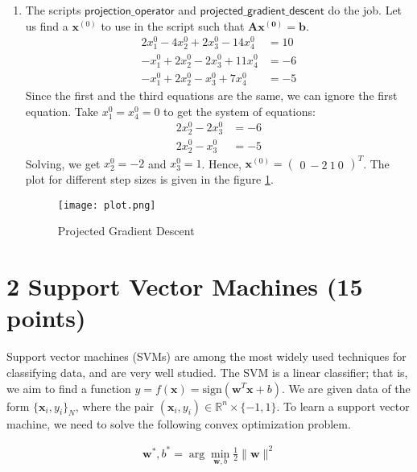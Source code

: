\documentclass[12pt,a4paper]{article}
\newcommand{\R}{\mathbb{R}}
\theoremstyle{remark}
\begin{document}
\begin{enumerate}
    \item The scripts $\mathsf{projection\_operator}$ and $\mathsf{projected\_gradient\_descent}$ do the job. Let us find a $\mathbf{x}^{(0)}$ to use in the script such that $\mathbf{Ax^{(0)} = b}$.
    \begin{align*}
        2x_1^0 - 4x_2^0 + 2x_3^0 - 14x_4^0 &= 10\\
        -x_1^0 + 2x_2^0 - 2x_3^0 + 11x_4^0 &= -6\\
        -x_1^0 + 2x_2^0 - x_3^0 + 7x_4^0 &= -5
    \end{align*}
    Since the first and the third equations are the same, we can ignore the first equation. Take $x_1^0 = x_4^0 = 0$ to get the system of equations:
    \begin{align*}
        2x_2^0 - 2x_3^0 &= -6\\
        2x_2^0 - x_3^0 &= -5
    \end{align*}
    Solving, we get $x_2^0 = -2$ and $x_3^0 = 1$. Hence, $\mathbf{x}^{(0)} = \begin{pmatrix}
        0\
        -2\
        1\
        0
    \end{pmatrix}^T$. The plot for different step sizes is given in the figure \ref{fig:projection}.
    \begin{figure}
        \centering
        \texttt{[image: plot.png]}
        \caption{Projected Gradient Descent}
        \label{fig:projection}
    \end{figure}
\end{enumerate}

\section*{2 Support Vector Machines (15 points)}

Support vector machines (SVMs) are among the most widely used techniques for classifying data, and are very well studied. The SVM is a linear classifier; that is, we aim to find a function $y = f(\mathbf{x}) = \text{sign}(\mathbf{w}^T \mathbf{x} + b)$. We are given data of the form $\{\mathbf{x}_i, y_i\}_N$, where the pair $(\mathbf{x}_i, y_i) \in \R^n \times \{-1, 1\}$. To learn a support vector machine, we need to solve the following convex optimization problem.

\begin{align*}
    \mathbf{w}^*, b^* = \arg\min_{\mathbf{w}, b} \frac{1}{2} \|\mathbf{w}\|^2
\end{align*}
\end{document}
